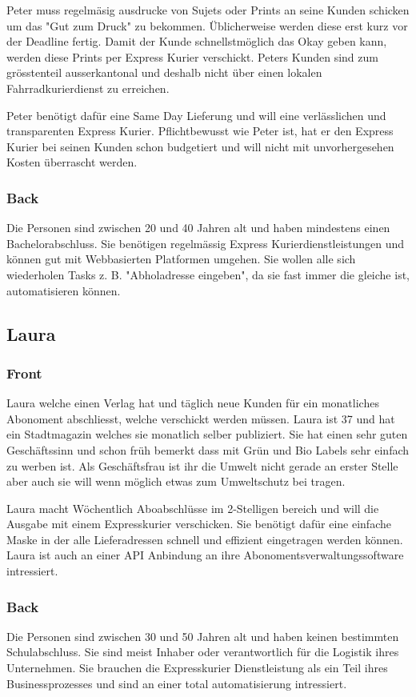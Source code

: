 Peter muss regelmäsig ausdrucke von Sujets oder Prints an seine Kunden schicken um das "Gut zum Druck" zu bekommen. Üblicherweise werden diese erst kurz vor der Deadline fertig. Damit der Kunde schnellstmöglich das Okay geben kann, werden diese Prints per Express Kurier verschickt. Peters Kunden sind zum grösstenteil ausserkantonal und deshalb nicht über einen lokalen Fahrradkurierdienst zu erreichen.

Peter benötigt dafür eine Same Day Lieferung und will eine verlässlichen und transparenten Express Kurier. Pflichtbewusst wie Peter ist, hat er den Express Kurier bei seinen Kunden schon budgetiert und will nicht mit unvorhergesehen Kosten überrascht werden.

\subsubsection{Back}
Die Personen sind zwischen 20 und 40 Jahren alt und haben mindestens einen Bachelorabschluss. Sie benötigen regelmässig Express Kurierdienstleistungen und können gut mit Webbasierten Platformen umgehen. Sie wollen alle sich wiederholen Tasks z. B. "Abholadresse eingeben", da sie fast immer die gleiche ist, automatisieren können.

\subsection{Laura}
\subsubsection{Front}
Laura welche einen Verlag hat und täglich neue Kunden für ein monatliches Abonoment abschliesst, welche verschickt werden müssen.
Laura ist 37 und hat ein Stadtmagazin welches sie monatlich selber publiziert. Sie hat einen sehr guten Geschäftssinn und schon früh bemerkt dass mit Grün und Bio Labels sehr einfach zu werben ist. Als Geschäftsfrau ist ihr die Umwelt nicht gerade an erster Stelle aber auch sie will wenn möglich etwas zum Umweltschutz bei tragen.

Laura macht Wöchentlich Aboabschlüsse im 2-Stelligen bereich und will die Ausgabe mit einem Expresskurier verschicken. Sie benötigt dafür eine einfache Maske in der alle Lieferadressen schnell und effizient eingetragen werden können. Laura ist auch an einer API Anbindung an ihre Abonomentsverwaltungssoftware intressiert.

\subsubsection{Back}
Die Personen sind zwischen 30 und 50 Jahren alt und haben keinen bestimmten Schulabschluss. Sie sind meist Inhaber oder verantwortlich für die Logistik ihres Unternehmen. Sie brauchen die Expresskurier Dienstleistung als ein Teil ihres Businessprozesses und sind an einer total automatisierung intressiert.

